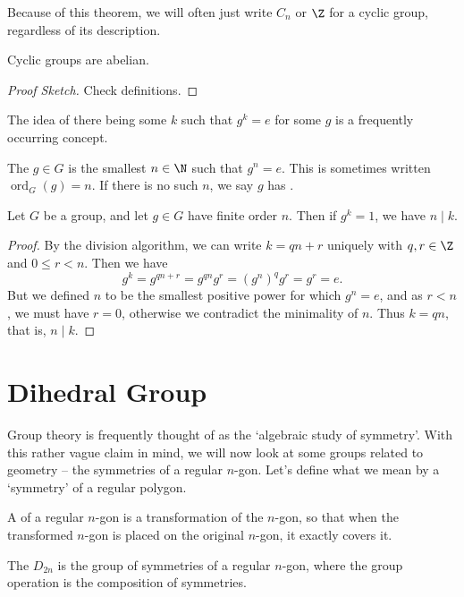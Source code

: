 \documentclass[a4]{scrreprt}
\newcommand{\newsection}{\section}
\begin{document}
Because of this theorem, we will often just write $C_n$ or $\Z$ for a cyclic group, regardless of its description.

\begin{proposition}
	Cyclic groups are abelian.
\end{proposition}
\begin{proof}[Proof Sketch]
	Check definitions.
\end{proof}

The idea of there being some $k$ such that $g^k = e$ for some $g$ is a frequently occurring concept.

\begin{definition}
	The  $g \in G$ is the smallest $n \in \N$ such that $g^n = e$. This is sometimes written $\operatorname{ord}_G(g) = n$. If there is no such $n$, we say $g$ has .
\end{definition}

\begin{theorem}
	Let $G$ be a group, and let $g \in G$ have finite order $n$. Then if $g^k = 1$, we have $n \mid k$.
\end{theorem}
\begin{proof}
	By the division algorithm, we can write $k = qn + r$ uniquely with $q, r \in \Z$ and $0 \leq r < n$. Then we have
	$$
	g^{k} = g^{qn + r} = g^{qn} g^r = (g^n)^q g^r = g^r = e.
	$$
	But we defined $n$ to be the smallest positive power for which $g^n = e$, and as $r < n$, we must have $r = 0$, otherwise we contradict the minimality of $n$. Thus $k = qn$, that is, $n \mid k$.
\end{proof}

\newsection{Dihedral Group}

Group theory is frequently thought of as the `algebraic study of symmetry'. With this rather vague claim in mind, we will now look at some groups related to geometry -- the symmetries of a regular $n$-gon. Let's define what we mean by a `symmetry' of a regular polygon.

\begin{definition}
	A  of a regular $n$-gon is a transformation of the $n$-gon, so that when the transformed $n$-gon is placed on the original $n$-gon, it exactly covers it.
\end{definition}

\begin{definition}
	The  $D_{2n}$ is the group of symmetries of a regular $n$-gon, where the group operation is the composition of symmetries.
\end{definition}
\end{document}
